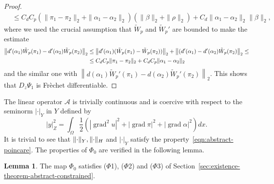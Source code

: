 \documentclass[a4paper,10pt,oneside]{amsbook}
\numberwithin{section}{chapter}
\numberwithin{equation}{chapter}
\theoremstyle{definition}
\newtheorem{lemma}[prop]{Lemma}
\DeclareMathOperator{\grad}{grad}
\DeclarePairedDelimiter{\norm}{\lVert}{\rVert}
\begin{document}
\begin{proof}
\[\begin{split}
&\le C_d{C}_p\left(\|\pi_1-\pi_2\|_2+\|\alpha_1-\alpha_2\|_2\right)\left(\|\beta\|_2+\|\rho\|_2\right)+C_d\|\alpha_1-\alpha_2\|_2\|\beta\|_2,
\end{split}
\]
where we used the crucial assumption that $\tilde W_p$ and $\tilde W_p'$ are bounded to make the estimate
\[
\begin{split}
\left\|d'(\alpha_1)\tilde W_p(\pi_1)-d'(\alpha_2)\tilde W_p(\pi_2)\right\|_2&\le\left\|d'(\alpha_1)(\tilde W_p(\pi_1)-\tilde W_p(\pi_2))\right\|_2+\left\|(d'(\alpha_1)-d'(\alpha_2)\tilde W_p(\pi_2)\right\|_2\le\\
&\le C_dC_p\norm{\pi_1-\pi_2}_2+C_dC_p\norm{\alpha_1-\alpha_2}_2
\end{split}
\]
and the similar one with $\left\|d(\alpha_1)\tilde W_p'(\pi_1)-d(\alpha_2)\tilde W_p'(\pi_2)\right\|_2$. This shows that $D_z\Psi_1$ is Frèchet differentiable.
\end{proof}
The linear operator $\mathcal{A}$ is trivially continuous and is coercive with respect to the seminorm $|\cdot|_Y$ in $Y$ defined by
\[
|y|_Z^2=\int_\Omega\frac{1}{2}\left(|\grad^2u|^2+|\grad\pi|^2+|\grad\alpha|^2\right)dx.
\]
It is trivial to see that $\norm{\cdot}_Y,\norm{\cdot}_H$ and $|\cdot|_Y$ satisfy the property~\eqref{eqn:abstract-poincare}. The properties of $\Phi_0$ are verified in the following lemma.
\begin{lemma}
The map $\Phi_0$ satisfies ($\Phi$1), ($\Phi$2) and ($\Phi$3) of Section~\ref{sec:existence-theorem-abstract-constrained}.
\end{lemma}
\end{document}
